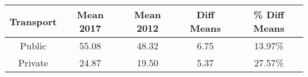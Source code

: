 \begin{table}[ht]
\centering
\begin{tabular}{ccccc}
  \hline
Transport & Mean 2017 & Mean 2012 & Diff Means & \% Diff Means \\ 
  \hline
Public & 55.08 & 48.32 & 6.75 & 13.97\% \\ 
  Private & 24.87 & 19.50 & 5.37 & 27.57\% \\ 
   \hline
\end{tabular}
\end{table}
